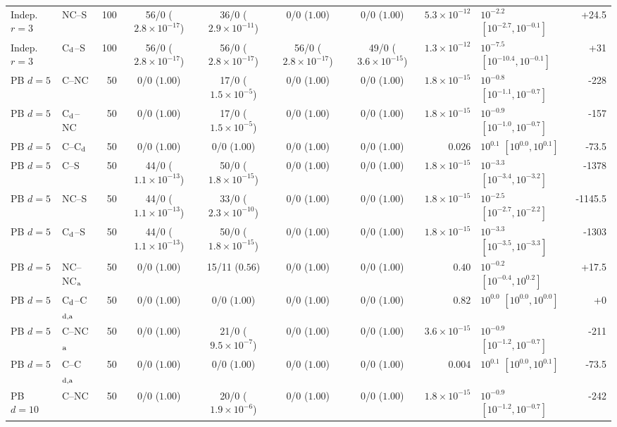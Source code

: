\begin{tabular}{@{}llr cccc r l r@{}}
Indep. $r=3$ & NC--S & 100 & 56/0 ($2.8\times10^{-17}$) & 36/0 ($2.9\times10^{-11}$) & 0/0 ($1.00$) & 0/0 ($1.00$) & $5.3\times10^{-12}$ & $10^{-2.2}$ $[10^{-2.7},10^{-0.1}]$ & +24.5\\
Indep. $r=3$ & C$_{\rm d}$--S & 100 & 56/0 ($2.8\times10^{-17}$) & 56/0 ($2.8\times10^{-17}$) & 56/0 ($2.8\times10^{-17}$) & 49/0 ($3.6\times10^{-15}$) & $1.3\times10^{-12}$ & $10^{-7.5}$ $[10^{-10.4},10^{-0.1}]$ & +31\\
\midrule
PB $d=5$ & C--NC & 50 & 0/0 ($1.00$) & 17/0 ($1.5\times10^{-5}$) & 0/0 ($1.00$) & 0/0 ($1.00$) & $1.8\times10^{-15}$ & $10^{-0.8}$ $[10^{-1.1},10^{-0.7}]$ & -228\\
PB $d=5$ & C$_{\rm d}$--NC & 50 & 0/0 ($1.00$) & 17/0 ($1.5\times10^{-5}$) & 0/0 ($1.00$) & 0/0 ($1.00$) & $1.8\times10^{-15}$ & $10^{-0.9}$ $[10^{-1.0},10^{-0.7}]$ & -157\\
PB $d=5$ & C--C$_{\rm d}$ & 50 & 0/0 ($1.00$) & 0/0 ($1.00$) & 0/0 ($1.00$) & 0/0 ($1.00$) & $0.026$ & $10^{0.1}$ $[10^{0.0},10^{0.1}]$ & -73.5\\
PB $d=5$ & C--S & 50 & 44/0 ($1.1\times10^{-13}$) & 50/0 ($1.8\times10^{-15}$) & 0/0 ($1.00$) & 0/0 ($1.00$) & $1.8\times10^{-15}$ & $10^{-3.3}$ $[10^{-3.4},10^{-3.2}]$ & -1378\\
PB $d=5$ & NC--S & 50 & 44/0 ($1.1\times10^{-13}$) & 33/0 ($2.3\times10^{-10}$) & 0/0 ($1.00$) & 0/0 ($1.00$) & $1.8\times10^{-15}$ & $10^{-2.5}$ $[10^{-2.7},10^{-2.2}]$ & -1145.5\\
PB $d=5$ & C$_{\rm d}$--S & 50 & 44/0 ($1.1\times10^{-13}$) & 50/0 ($1.8\times10^{-15}$) & 0/0 ($1.00$) & 0/0 ($1.00$) & $1.8\times10^{-15}$ & $10^{-3.3}$ $[10^{-3.5},10^{-3.3}]$ & -1303\\
PB $d=5$ & NC--NC$_{\rm a}$ & 50 & 0/0 ($1.00$) & 15/11 ($0.56$) & 0/0 ($1.00$) & 0/0 ($1.00$) & $0.40$ & $10^{-0.2}$ $[10^{-0.4},10^{0.2}]$ & +17.5\\
PB $d=5$ & C$_{\rm d}$--C$_{\rm d,a}$ & 50 & 0/0 ($1.00$) & 0/0 ($1.00$) & 0/0 ($1.00$) & 0/0 ($1.00$) & $0.82$ & $10^{0.0}$ $[10^{0.0},10^{0.0}]$ & +0\\
PB $d=5$ & C--NC$_{\rm a}$ & 50 & 0/0 ($1.00$) & 21/0 ($9.5\times10^{-7}$) & 0/0 ($1.00$) & 0/0 ($1.00$) & $3.6\times10^{-15}$ & $10^{-0.9}$ $[10^{-1.2},10^{-0.7}]$ & -211\\
PB $d=5$ & C--C$_{\rm d,a}$ & 50 & 0/0 ($1.00$) & 0/0 ($1.00$) & 0/0 ($1.00$) & 0/0 ($1.00$) & $0.004$ & $10^{0.1}$ $[10^{0.0},10^{0.1}]$ & -73.5\\
PB $d=10$ & C--NC & 50 & 0/0 ($1.00$) & 20/0 ($1.9\times10^{-6}$) & 0/0 ($1.00$) & 0/0 ($1.00$) & $1.8\times10^{-15}$ & $10^{-0.9}$ $[10^{-1.2},10^{-0.7}]$ & -242\\

\end{tabular}
